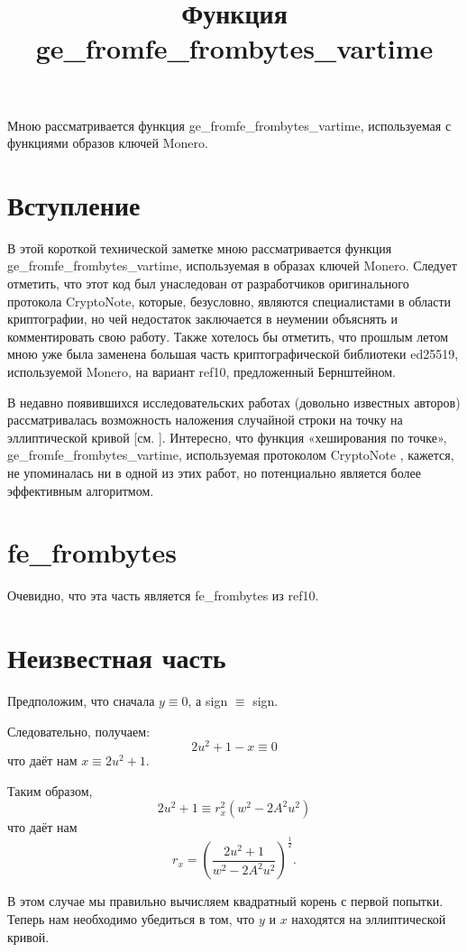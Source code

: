 \documentclass[12pt,english]{mrl}
\title{Функция ge\_fromfe\_frombytes\_vartime}
\begin{document}
\begin{center}
{}
\end{center}

Мною рассматривается функция ge\_fromfe\_frombytes\_vartime, используемая с функциями образов ключей Monero.

\section{Вступление}
В этой короткой технической заметке мною рассматривается функция ge\_fromfe\_frombytes\_vartime, используемая в образах ключей Monero. Следует отметить, что этот код был унаследован от разработчиков оригинального протокола CryptoNote, которые, безусловно, являются специалистами в области криптографии, но чей недостаток заключается в неумении объяснять и комментировать свою работу. Также хотелось бы отметить, что прошлым летом мною уже была заменена большая часть криптографической библиотеки ed25519, используемой Monero, на вариант ref10, предложенный Бернштейном.

В недавно появившихся исследовательских работах (довольно известных авторов) рассматривалась возможность наложения случайной строки на точку на эллиптической кривой [см. \cite{Tib2010,Tib2013}]. Интересно, что функция «хеширования по точке», ge\_fromfe\_frombytes\_vartime, используемая протоколом CryptoNote \cite{CN}, кажется, не упоминалась ни в одной из этих работ, но потенциально является более эффективным алгоритмом.


\section{fe\_frombytes}
Очевидно, что эта часть является fe\_frombytes из ref10.

\section{Неизвестная часть}
Предположим, что сначала $y\equiv 0$, а sign $\equiv $ sign.

Следовательно, получаем:
\[
2u^2 + 1 - x \equiv 0
\]
что даёт нам $x\equiv 2u^2 + 1$.

Таким образом,
\[
2u^2 + 1 \equiv r_x^2 (w^2 - 2A^2 u^2)
\]
что даёт нам
\[
r_x = \left(\frac{2u^2 + 1}{w^2 - 2A^2 u^2}\right)^{\frac{1}{2}}.
\]

В этом случае мы правильно вычисляем квадратный корень с первой попытки. Теперь нам необходимо убедиться в том, что $y$ и $x$ находятся на эллиптической кривой.
\end{document}
